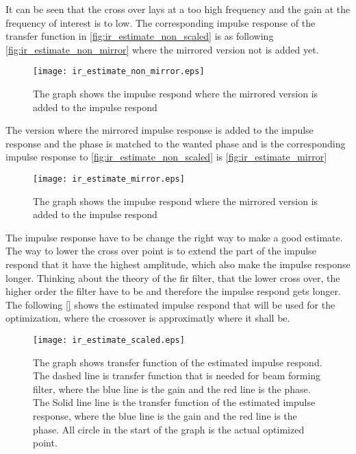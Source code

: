 It can be seen that the cross over lays at a too high frequency and the gain at the frequency of interest is to low. The corresponding impulse response of the transfer function in \autoref{fig:ir_estimate_non_scaled} is as following \autoref{fig:ir_estimate_non_mirror} where the mirrored version not is added yet. 

\begin{figure}[H]
	\centering
	\texttt{[image: ir\_estimate\_non\_mirror.eps]}
	\caption{The graph shows the impulse respond where the mirrored version is added to the impulse respond}
		\label{fig:ir_estimate_non_mirror}
\end{figure}

The version where the mirrored impulse response is added to the impulse response and the phase is matched to the wanted phase and is the corresponding impulse response to \autoref{fig:ir_estimate_non_scaled} is \autoref{fig:ir_estimate_mirror}

\begin{figure}[H]
	\centering
	\texttt{[image: ir\_estimate\_mirror.eps]}
	\caption{The graph shows the impulse respond where the mirrored version is added to the impulse respond}
		\label{fig:ir_estimate_mirror}
\end{figure}


The impulse response have to be change the right way to make a good estimate. The way to lower the cross over point is to extend the part of the impulse respond that it have the highest amplitude, which also make the impulse response longer. Thinking about the theory of the \gls{fir} filter, that the lower cross over, the higher order the filter have to be and therefore the impulse respond gets longer. The following \autoref{} shows the estimated impulse respond that will be used for the optimization, where the crossover is approximatly where it shall be. 


\begin{figure}[H]
	\centering
	\texttt{[image: ir\_estimate\_scaled.eps]}
	\caption{The graph shows transfer function of the estimated impulse respond. The dashed line is transfer function that is needed for beam forming filter, where the blue line is the gain and the red line is the phase. The Solid line line is the transfer function of the estimated impulse response, where the blue line is the gain and the red line is the phase. All circle in the start of the graph is the actual optimized point.}
		\label{fig:ir_estimate_scaled}
\end{figure}


